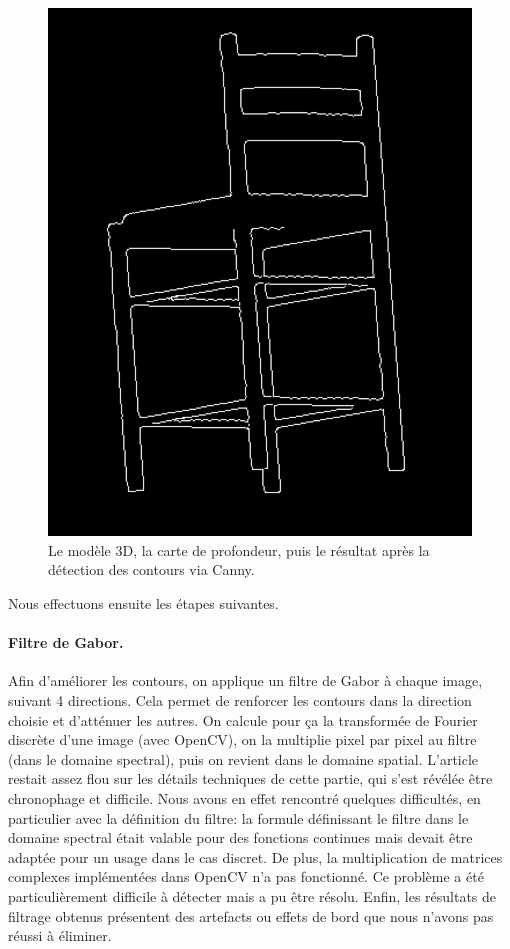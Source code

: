 \documentclass[12pt, a4paper, oneside]{article}
\begin{document}
\begin{figure}
\begin{center}
        \includegraphics[scale=0.41]{images/chaise-cany.png}
        \caption{Le modèle 3D, la carte de profondeur, puis le résultat après la détection des contours via Canny.\label{img:generer-vues}}
    \end{center}
\end{figure}

Nous effectuons ensuite les étapes suivantes.
\paragraph{Filtre de Gabor.}
Afin d'améliorer les contours, on applique un filtre de Gabor à chaque image, suivant 4 directions.
Cela permet de renforcer les contours dans la direction choisie et d'atténuer les autres.
On calcule pour ça la transformée de Fourier discrète d'une image (avec OpenCV), on la multiplie pixel par pixel au filtre (dans le domaine spectral), puis on revient dans le domaine spatial.
L'article restait assez flou sur les détails techniques de cette partie, qui s'est révélée être chronophage et difficile.
Nous avons en effet rencontré quelques difficultés, en particulier avec la définition du filtre: la formule définissant le filtre dans le domaine spectral était valable pour des fonctions continues mais devait être adaptée pour un usage dans le cas discret.
De plus, la multiplication de matrices complexes implémentées dans OpenCV n'a pas fonctionné.
Ce problème a été particulièrement difficile à détecter mais a pu être résolu.
Enfin, les résultats de filtrage obtenus présentent des artefacts ou effets de bord que nous n'avons pas réussi à éliminer.
\end{document}
